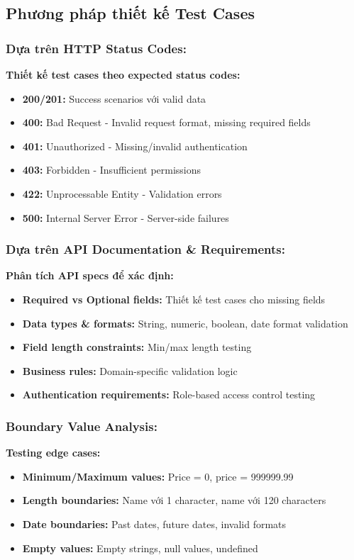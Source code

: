 \documentclass[12pt,a4paper]{article}
\begin{document}
  \subsection{Phương pháp thiết kế Test Cases}

  \subsubsection{Dựa trên HTTP Status Codes:}
  \textbf{Thiết kế test cases theo expected status codes:}
  \begin{itemize}
  \item \textbf{200/201:} Success scenarios với valid data
  \item \textbf{400:} Bad Request - Invalid request format, missing required fields
  \item \textbf{401:} Unauthorized - Missing/invalid authentication
  \item \textbf{403:} Forbidden - Insufficient permissions
  \item \textbf{422:} Unprocessable Entity - Validation errors
  \item \textbf{500:} Internal Server Error - Server-side failures
  \end{itemize}

  \subsubsection{Dựa trên API Documentation \& Requirements:}
  \textbf{Phân tích API specs để xác định:}
  \begin{itemize}
  \item \textbf{Required vs Optional fields:} Thiết kế test cases cho missing fields
  \item \textbf{Data types \& formats:} String, numeric, boolean, date format validation
  \item \textbf{Field length constraints:} Min/max length testing
  \item \textbf{Business rules:} Domain-specific validation logic
  \item \textbf{Authentication requirements:} Role-based access control testing
  \end{itemize}

  \subsubsection{Boundary Value Analysis:}
  \textbf{Testing edge cases:}
  \begin{itemize}
  \item \textbf{Minimum/Maximum values:} Price = 0, price = 999999.99
  \item \textbf{Length boundaries:} Name với 1 character, name với 120 characters
  \item \textbf{Date boundaries:} Past dates, future dates, invalid formats
  \item \textbf{Empty values:} Empty strings, null values, undefined
  \end{itemize}
\end{document}
